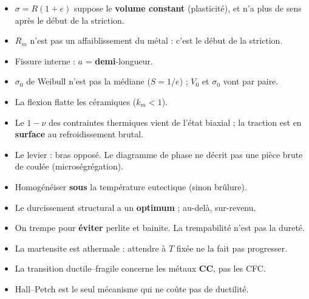 \begin{warnbox}[title={À ne pas oublier le jour de l'examen}]
\begin{itemize}
  \item $\sigma = R(1+e)$ suppose le \textbf{volume constant} (plasticité), et n'a plus de sens
        après le début de la striction.
  \item $R_m$ n'est pas un affaiblissement du métal : c'est le début de la striction.
  \item Fissure interne : $a$ = \textbf{demi}-longueur.
  \item $\sigma_0$ de Weibull n'est pas la médiane ($S = 1/e$) ; $V_0$ et $\sigma_0$ vont par paire.
  \item La flexion \og flatte\fg{} les céramiques ($k_m < 1$).
  \item Le $1-\nu$ des contraintes thermiques vient de l'état biaxial ; la traction est en
        \textbf{surface} au refroidissement brutal.
  \item Le levier : bras opposé. Le diagramme de phase ne décrit pas une pièce brute de coulée
        (microségrégation).
  \item Homogénéiser \textbf{sous} la température eutectique (sinon brûlure).
  \item Le durcissement structural a un \textbf{optimum} ; au-delà, sur-revenu.
  \item On trempe pour \textbf{éviter} perlite et bainite. La trempabilité n'est pas la dureté.
  \item La martensite est athermale : attendre à $T$ fixée ne la fait pas progresser.
  \item La transition ductile--fragile concerne les métaux \textbf{CC}, pas les CFC.
  \item Hall--Petch est le seul mécanisme qui ne coûte pas de ductilité.
\end{itemize}
\end{warnbox}

